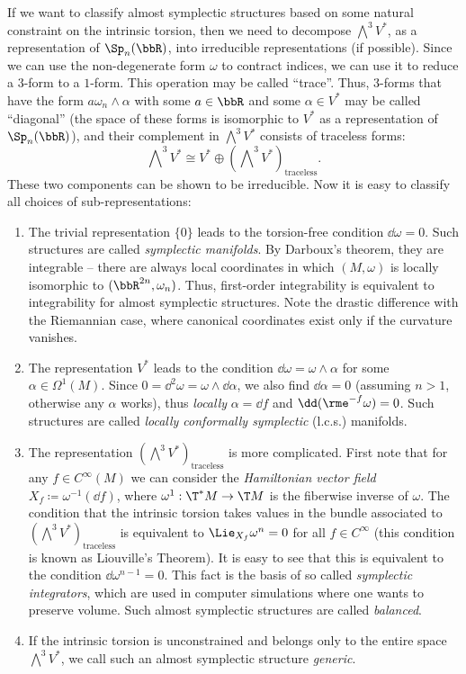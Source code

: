 \begin{example}
    If we want to classify almost symplectic structures based on some natural constraint on the intrinsic torsion, then we need to decompose $\bigwedge\nolimits^3 V^\ast$, as a representation of $\Sp_{n}(\bbR)$, into irreducible representations (if possible). Since we can use the non-degenerate form $\omega$ to contract indices, we can use it to reduce a $3$-form to a $1$-form. This operation may be called ``trace''. Thus, $3$-forms that have the form $a\omega_n\wedge\alpha$ with some $a\in\bbR$ and some $\alpha\in V^\ast$ may be called ``diagonal'' (the space of these forms is isomorphic to $V^\ast$ as a representation of $\Sp_n(\bbR)$), and their complement in $\bigwedge\nolimits^3 V^\ast$ consists of traceless forms:
    \[\bigwedge\nolimits^3 V^\ast \cong V^\ast\oplus \left(\bigwedge\nolimits^3 V^\ast\right)_{\mathrm{traceless}}.\]
    These two components can be shown to be irreducible. Now it is easy to classify all choices of sub-representations:
    \begin{enumerate}
        \item The trivial representation $\{0\}$ leads to the torsion-free condition $\dd\omega=0$. Such structures are called \emph{symplectic manifolds}. By Darboux's theorem, they are integrable -- there are always local coordinates in which $(M,\omega)$ is locally isomorphic to $(\bbR^{2n},\omega_n)$. Thus, first-order integrability is equivalent to integrability for almost symplectic structures. Note the drastic difference with the Riemannian case, where canonical coordinates exist only if the curvature vanishes.
        \item The representation $V^\ast$ leads to the condition $\dd\omega=\omega\wedge \alpha$ for some $\alpha\in\Omega^1(M)$. Since $0=\dd^2\omega=\omega\wedge\dd\alpha$, we also find $\dd\alpha=0$ (assuming $n>1$, otherwise any $\alpha$ works), thus \emph{locally} $\alpha=\dd f$ and $\dd (\rme^{-f}\omega)=0$. Such structures are called \emph{locally conformally symplectic} (l.c.s.) manifolds.
        \item The representation $\left(\bigwedge\nolimits^3 V^\ast\right)_{\mathrm{traceless}}$ is more complicated. First note that for any $f\in C^\infty(M)$ we can consider the \emph{Hamiltonian vector field} $X_f\coloneqq \omega^{-1}(\dd f)$, where $\omega^1:\T^\ast M\to \T M$ is the fiberwise inverse of $\omega$. The condition that the intrinsic torsion takes values in the bundle associated to $\left(\bigwedge\nolimits^3 V^\ast\right)_{\mathrm{traceless}}$ is equivalent to $\Lie_{X_f}\omega^n=0$ for all $f\in C^\infty$ (this condition is known as Liouville's Theorem). It is easy to see that this is equivalent to the condition $\dd\omega^{n-1}=0$. This fact is the basis of so called \emph{symplectic integrators}, which are used in computer simulations where one wants to preserve volume. Such almost symplectic structures are called \emph{balanced}.
        \item If the intrinsic torsion is unconstrained and belongs only to the entire space $\bigwedge\nolimits^3 V^\ast$, we call such an almost symplectic structure \emph{generic}.
    \end{enumerate}
\end{example}


